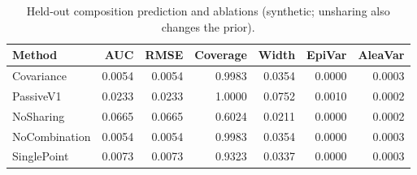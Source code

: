 \begin{table}[t]
\caption{Held-out composition prediction and ablations (synthetic; unsharing also changes the prior).}
\label{tab:experiment3}
\begin{tabular}{lrrrrrr}
\toprule
Method & AUC & RMSE & Coverage & Width & EpiVar & AleaVar \\
\midrule
Covariance & 0.0054 & 0.0054 & 0.9983 & 0.0354 & 0.0000 & 0.0003 \\
PassiveV1 & 0.0233 & 0.0233 & 1.0000 & 0.0752 & 0.0010 & 0.0002 \\
NoSharing & 0.0665 & 0.0665 & 0.6024 & 0.0211 & 0.0000 & 0.0002 \\
NoCombination & 0.0054 & 0.0054 & 0.9983 & 0.0354 & 0.0000 & 0.0003 \\
SinglePoint & 0.0073 & 0.0073 & 0.9323 & 0.0337 & 0.0000 & 0.0003 \\
\bottomrule
\end{tabular}
\end{table}
